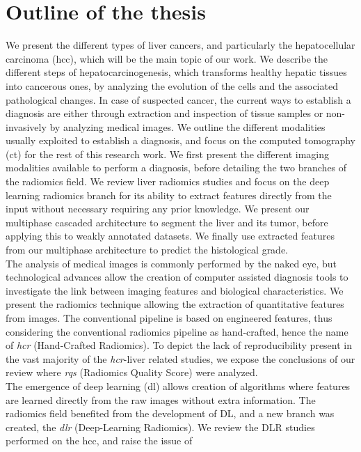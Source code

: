 \section{Outline of the thesis}
We present the different types of liver cancers, and particularly the
hepatocellular carcinoma (\ac{hcc}), which will be the main topic of our work.
We describe the different steps of hepatocarcinogenesis, which
transforms healthy hepatic tissues into cancerous ones, by analyzing the
evolution of the cells and the associated pathological changes. 
In case of suspected cancer, the current ways to establish a diagnosis 
are either through extraction and inspection of tissue samples or 
non-invasively by analyzing medical images.  We outline the different modalities usually exploited to establish a
diagnosis, and focus on the computed tomography (\ac{ct}) for the rest of this
research work.  We first present the different imaging modalities available to perform a
diagnosis, before detailing the two branches of the radiomics field. We
review liver radiomics studies and focus on the deep learning radiomics
branch for its ability to extract features directly from the input without 
necessary requiring any prior knowledge. We present our multiphase 
cascaded architecture to segment the liver and
its tumor, before applying this to weakly annotated datasets. We finally
use extracted features from our multiphase architecture to predict the
histological grade. \\
The analysis of medical images is commonly performed by the naked eye,
but technological advances allow the creation of computer assisted
diagnosis tools to investigate the link between imaging features 
and biological characteristics.
We present the radiomics technique allowing the extraction of
quantitative features from images. The conventional pipeline is based on 
engineered features, thus considering the conventional radiomics pipeline as
hand-crafted, hence the name of \emph{\ac{hcr}} (Hand-Crafted Radiomics).
To depict the lack of reproducibility present in the vast majority of
the \emph{\ac{hcr}}-liver related studies, we expose the conclusions of our
review where \emph{\ac{rqs}} (Radiomics Quality Score) were analyzed. \\
The emergence of deep learning (\ac{dl}) allows creation of algorithms where
features are learned directly from the raw images without extra information. 
The radiomics field benefited from the development of DL, and a new branch 
was created, the \emph{\ac{dlr}} (Deep-Learning Radiomics).
We review the DLR studies performed on the \ac{hcc}, and raise the issue of
